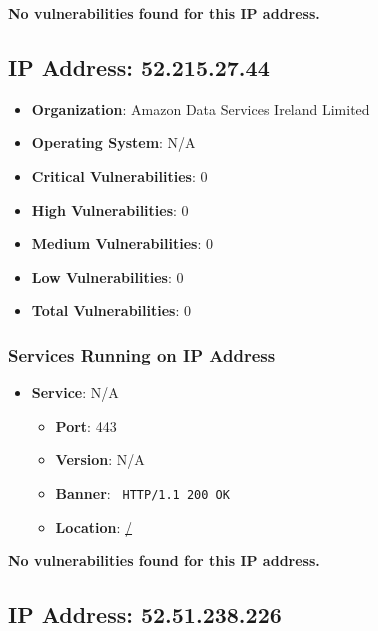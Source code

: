 \documentclass{article}
\begin{document}
\textbf{No vulnerabilities found for this IP address.}


\clearpage



\subsection*{IP Address: 52.215.27.44}

\begin{itemize}
    \item \textbf{Organization}: Amazon Data Services Ireland Limited
    \item \textbf{Operating System}:  N/A 
    \item \textbf{Critical Vulnerabilities}: 0
    \item \textbf{High Vulnerabilities}: 0
    \item \textbf{Medium Vulnerabilities}: 0
    \item \textbf{Low Vulnerabilities}: 0
    \item \textbf{Total Vulnerabilities}: 0
\end{itemize}

\subsubsection*{Services Running on IP Address}

\begin{itemize}
    
        \item \textbf{Service}: N/A
        \begin{itemize}
            \item \textbf{Port}: 443
            \item \textbf{Version}:  N/A 
            \item \textbf{Banner}: \texttt{ HTTP/1.1 200 OK
 }
            \item \textbf{Location}: \href{ / }{ / }
        \end{itemize}
    
\end{itemize}


\textbf{No vulnerabilities found for this IP address.}


\clearpage



\subsection*{IP Address: 52.51.238.226}
\end{document}
